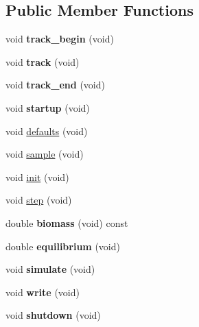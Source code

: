 \subsection*{Public Member Functions}
\begin{DoxyCompactItemize}
\item 
\hypertarget{classIOSKJ_1_1Model_ae261a53c42f71d17182c1b129698126d}{void {\bfseries track\-\_\-begin} (void)}\label{classIOSKJ_1_1Model_ae261a53c42f71d17182c1b129698126d}

\item 
\hypertarget{classIOSKJ_1_1Model_af18a3687dd2685745174b91e0aae56ce}{void {\bfseries track} (void)}\label{classIOSKJ_1_1Model_af18a3687dd2685745174b91e0aae56ce}

\item 
\hypertarget{classIOSKJ_1_1Model_a03e6aeb637c83c34774ac66c18bac74d}{void {\bfseries track\-\_\-end} (void)}\label{classIOSKJ_1_1Model_a03e6aeb637c83c34774ac66c18bac74d}

\item 
\hypertarget{classIOSKJ_1_1Model_a6f42bfc7352faa7bba7e00d04fc166b0}{void {\bfseries startup} (void)}\label{classIOSKJ_1_1Model_a6f42bfc7352faa7bba7e00d04fc166b0}

\item 
void \hyperlink{classIOSKJ_1_1Model_a2018db7a3e7780fddc161f026dd35c4e}{defaults} (void)
\item 
void \hyperlink{classIOSKJ_1_1Model_a242ba7c47871099bf4bed482d262cede}{sample} (void)
\item 
void \hyperlink{classIOSKJ_1_1Model_af64274ff5991d11e1c232618af8de800}{init} (void)
\item 
void \hyperlink{classIOSKJ_1_1Model_af163ebda22001c7df308dc227c1687bb}{step} (void)
\item 
\hypertarget{classIOSKJ_1_1Model_a1f1a75ddee2aa7203e7a944b267d4362}{double {\bfseries biomass} (void) const }\label{classIOSKJ_1_1Model_a1f1a75ddee2aa7203e7a944b267d4362}

\item 
\hypertarget{classIOSKJ_1_1Model_aa422925a07c078b87c5727a6a7c22d00}{double {\bfseries equilibrium} (void)}\label{classIOSKJ_1_1Model_aa422925a07c078b87c5727a6a7c22d00}

\item 
\hypertarget{classIOSKJ_1_1Model_abf9ebdb10aee501808836438cb542fab}{void {\bfseries simulate} (void)}\label{classIOSKJ_1_1Model_abf9ebdb10aee501808836438cb542fab}

\item 
\hypertarget{classIOSKJ_1_1Model_abfc09c1b2d6bfe2802835cd5fd58c3b3}{void {\bfseries write} (void)}\label{classIOSKJ_1_1Model_abfc09c1b2d6bfe2802835cd5fd58c3b3}

\item 
\hypertarget{classIOSKJ_1_1Model_a343216d7c9019f15f01f205423001005}{void {\bfseries shutdown} (void)}\label{classIOSKJ_1_1Model_a343216d7c9019f15f01f205423001005}

\end{DoxyCompactItemize}
